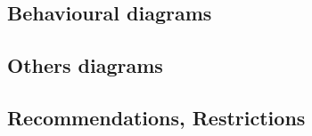 \subsection{Behavioural diagrams}


\begin{comment}
Why ? When ? How ?

First ideas :

  	\begin{itemize}
  		\item use case 
  		\item state machines
  		  \begin{itemize}
		  	\item What : description of how the state of the system evolved
		  	\item Why : to describe at high level some behaviour 
		  	\item Recommendations ?
		  \end{itemize}
  		\item activities
  		\item sequence
  		  \begin{itemize}
  	\item What: description of sequence of function
  	\item Why: to describe communication between items, specify expected  (oracle)
  	\item Recommendations: 
  	\begin{itemize}
  		\item limit the size for readability
  	\end{itemize}
  \end{itemize}

	\end{itemize}  	

\end{comment}


\subsection{Others diagrams}


\begin{comment}
Why ? When ? How ?

First ideas :

 	\begin{itemize}
  		\item requirement
  		\item ... ?
	\end{itemize}  	

\end{comment}



\subsection{Recommendations, Restrictions}



\begin{comment}
Which elements are recommended or not.

\end{comment}

